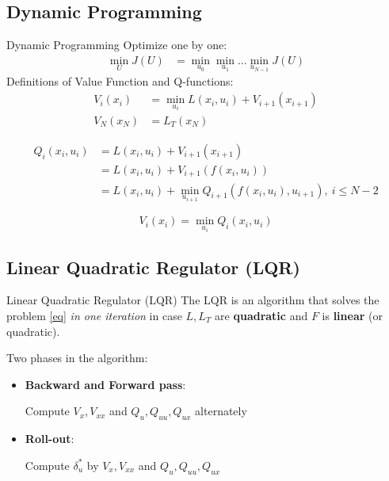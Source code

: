 \documentclass{beamer}
\begin{document}
\subsection{Dynamic Programming}
\begin{frame}{Dynamic Programming}
Optimize one by one:
\begin{equation}
\begin{split}
\min_{U} J(U) &= \min_{u_0} \min_{u_1} ... \min_{u_{N-1}} J(U)
\end{split}
\end{equation}
Definitions of Value Function and Q-functions:
\begin{equation}
\begin{split}
\label{vl}
V_i(x_i ) &= \min_{u_i}L(x_i,u_i) + V_{i+1}(x_{i+1}) \\
		V_N(x_N) &= L_T(x_N)
\end{split}
\end{equation}

\begin{equation}
\begin{split}
Q_i(x_i,u_i) &= L(x_i,u_i) + V_{i+1}(x_{i+1}) \\
				&= L(x_i,u_i) + V_{i+1}(f(x_i,u_i)) \\
				&= L(x_i,u_i) + \min_{u_{i+1}} Q_{i+1}(f(x_i,u_i), u_{i+1}),\ i \le N-2
\end{split}
\end{equation}

\begin{equation}
V_i(x_i) = \min_{u_i} Q_i(x_i, u_i) 
\end{equation}
\end{frame}

\subsection{Linear Quadratic Regulator (LQR)}

\begin{frame}{Linear Quadratic Regulator (LQR)}
The LQR is an algorithm that solves the problem \ref{eq} \emph{ in one iteration}
in case $L, L_T$ are \textbf{quadratic} and $F$ is \textbf{linear} (or quadratic). 

\medskip

Two phases in the algorithm: 
\begin{itemize}
\item \textbf{Backward and Forward pass}: 

Compute $V_x, V_{xx}$ and $Q_u, Q_{uu}, Q_{ux}$ alternately

\item \textbf{Roll-out}: 

Compute $\delta_u^*$ by $V_x, V_{xx}$ and $Q_u, Q_{uu}, Q_{ux}$

\end{itemize}


\end{frame}
\end{document}
